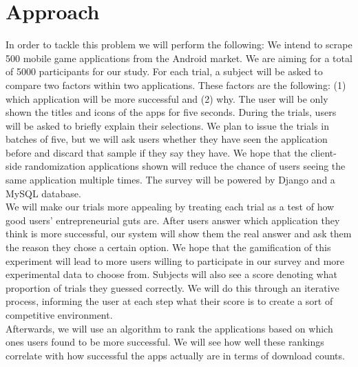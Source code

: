 \section{Approach}

In order to tackle this problem we will perform the following: We intend to scrape 500 mobile game applications from the Android market. We are aiming for a total of 5000 participants for our study. For each trial, a subject will be asked to compare two factors within two applications.  These factors are the following: (1) which application will be more successful and (2) why. The user will be only shown the titles and icons of the apps for five\?\? seconds. During the trials, users will be asked to briefly explain their selections. We plan to issue the trials in batches of five, but we will ask users whether they have seen the application before and discard that sample if they say they have. We hope that the client-side randomization applications shown will reduce the chance of users seeing the same application multiple times. The survey will be powered by Django and a MySQL database.\\

We will make our trials more appealing by treating each trial as a test of how good users' entrepreneurial guts are. After users answer which application they think is more successful, our system will show them the real answer and ask them the reason they chose a certain option. We hope that the gamification of this experiment will lead to more users willing to participate in our survey and more experimental data to choose from. Subjects will also see a score denoting what proportion of trials they guessed correctly. We will do this through an iterative process, informing the user at each step what their score is to create a sort of competitive environment.\\

Afterwards, we will use an algorithm to rank the applications based on which ones users found to be more successful. We will see how well these rankings correlate with how successful the apps actually are in terms of download counts.


